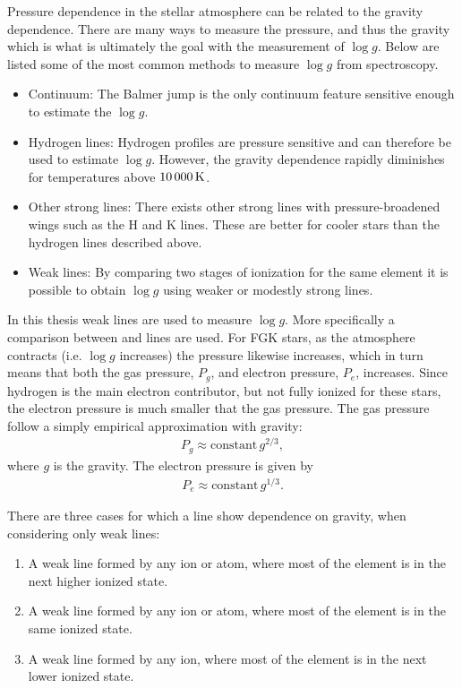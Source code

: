 Pressure dependence in the stellar atmosphere can be related to the gravity
dependence. There are many ways to measure the pressure, and thus the gravity
which is what is ultimately the goal with the measurement of $\log g$. Below are
listed some of the most common methods to measure $\log g$ from spectroscopy.

\begin{itemize}
  \item Continuum: The Balmer jump is the only continuum feature sensitive
        enough to estimate the $\log g$.
  \item Hydrogen lines: Hydrogen profiles are pressure sensitive and can
        therefore be used to estimate $\log g$. However, the gravity dependence
        rapidly diminishes for temperatures above $\SI{10\,000}{K}$.
  \item Other strong lines: There exists other strong lines with
        pressure-broadened wings such as the  H and K lines. These
        are better for cooler stars than the hydrogen lines described above.
  \item Weak lines: By comparing two stages of ionization for the same element
        it is possible to obtain $\log g$ using weaker or modestly strong lines.
\end{itemize}
In this thesis weak lines are used to measure $\log g$. More specifically a
comparison between  and  lines are used. For FGK stars,
as the atmosphere contracts (i.e. $\log g$ increases) the pressure likewise
increases, which in turn means that both the gas pressure, $P_g$, and electron
pressure, $P_e$, increases. Since hydrogen is the main electron contributor, but
not fully ionized for these stars, the electron pressure is much smaller that
the gas pressure. The gas pressure follow a simply empirical approximation with
gravity:
\begin{align}
  P_g \approx \mathrm{constant}\, g^{2/3},
\end{align}
where $g$ is the gravity. The electron pressure is given by
\begin{align}
  P_e \approx \mathrm{constant}\, g^{1/3}.
\end{align}

There are three cases for which a line show dependence on gravity, when
considering only weak lines:
\begin{enumerate}
  \item A weak line formed by any ion or atom, where most of the element is in
        the next higher ionized state.
  \item A weak line formed by any ion or atom, where most of the element is in
        the same ionized state.
  \item A weak line formed by any ion, where most of the element is in the next
        lower ionized state.
\end{enumerate}

